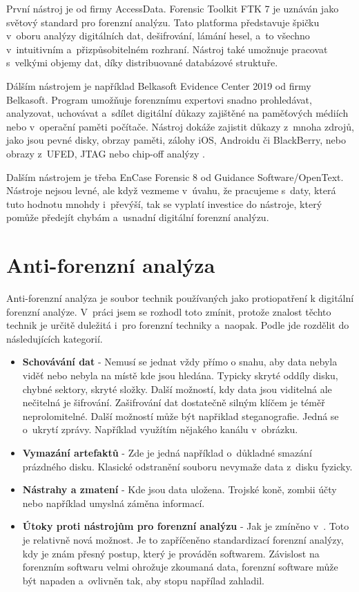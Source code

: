 \documentclass[thesis=B,czech]{FITthesis}[2012/06/26]
\begin{document}
První nástroj je od firmy AccessData. Forensic Toolkit FTK 7 je uznáván jako světový standard pro forenzní analýzu. Tato platforma představuje špičku v~oboru analýzy digitálních dat, dešifrování, lámání hesel, a~to všechno v~intuitivním a~přizpůsobitelném rozhraní. Nástroj také umožnuje pracovat s~velkými objemy dat, díky distribuované databázové struktuře.

Dálším nástrojem je například Belkasoft Evidence Center 2019 od firmy Belkasoft. Program umožňuje forenznímu expertovi snadno prohledávat, analyzovat, uchovávat a~sdílet digitální důkazy zajištěné na paměťových médiích nebo v~operační paměti počítače. Nástroj dokáže zajistit důkazy z~mnoha zdrojů, jako jsou pevné disky, obrzay paměti, zálohy iOS, Androidu či BlackBerry, nebo obrazy z~UFED, JTAG nebo chip-off analýzy \cite{for_soft}.

Dalším nástrojem je třeba EnCase Forensic 8 od Guidance Software/\-OpenText. Nástroje nejsou levné, ale když vezmeme v~úvahu, že pracujeme s~daty, která tuto hodnotu mnohdy i~převýší, tak se vyplatí investice do nástroje, který pomůže předejít chybám a~usnadní digitální forenzní analýzu.

\chapter{Anti-forenzní analýza}

Anti-forenzní analýza je soubor technik používaných jako protiopatření k digitální forenzní analýze. V~práci jsem se rozhodl toto zmínit, protože znalost těchto technik je určitě duležitá i~pro forenzní techniky a~naopak. Podle \cite{anti-prezi} jde rozdělit do následujících kategorií.

\begin{itemize}

\item \textbf{Schovávání dat} - Nemusí se jednat vždy přímo o snahu, aby data nebyla viděť nebo nebyla na místě kde jsou hledána. Typicky skryté oddíly disku, chybné sektory, skryté složky. Další možností, kdy data jsou viditelná ale nečitelná je šifrování. Zašifrování dat dostatečně silným klíčem je téměř neprolomitelné. Další možností může být napřiklad steganografie. Jedná se o~ukrytí zprávy. Například využítím nějakého kanálu v~obrázku.
\item \textbf{Vymazání artefaktů} - Zde je jedná například o~důkladné smazání prázdného disku. Klasické odstranění souboru nevymaže data z~disku fyzicky. 
\item \textbf{Nástrahy a zmatení} - Kde jsou data uložena. Trojské koně, zombii účty nebo například umyslná záměna informací. 
\item \textbf{Útoky proti nástrojům pro forenzní analýzu} - Jak je zmíněno v~\cite{anti-prezi}. Toto je relativně nová možnost. Je to zapříčeněno standardizací forenzní analýzy, kdy je znám přesný postup, který je prováděn softwarem. Závislost na forenzním softwaru velmi ohrožuje zkoumaná data, forenzní software může být napaden a~ovlivněn tak, aby stopu napřílad zahladil. 

\end{itemize}
\end{document}

